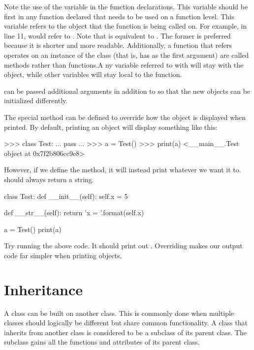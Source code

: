 \documentclass[11pt]{cselabheader}
\begin{document}
Note the use of the variable  in the function declarations.
This variable should be first in any function declared that needs to be used on
a function level. This variable refers to the object that the function is
being called on. For example, in line 11,  would refer to
. Note that  is equivalent to
. The former is preferred because it is shorter
and more readable. Additionally, a function that refers operates on an instance
of the class (that is, has  as the first argument) are called
methods rather than functions.A ny variable referred to with
 will stay with the object, while other
variables will stay local to the function.

 can be passed additional arguments in addition to
 so that the new objects can be initialized differently.

The special method  can be defined to override
how the object is displayed when printed. By default, printing an object will
display something like this:

\begin{pyconcode}
>>> class Test:
...     pass
...
>>> a = Test()
>>> print(a)
<__main__.Test object at 0x7f2b806cc9e8>
\end{pyconcode}

However, if we define the method, it will instead print whatever we want it
to.  should always return a string.

\begin{python3code}
class Test:
    def __init__(self):
        self.x = 5

    def __str__(self):
        return 'x = {}'.format(self.x)

a = Test()
print(a)
\end{python3code}

Try running the above code. It should print out . Overriding
 makes our output code far simpler when printing objects.

\section{Inheritance}
\label{sec:inheritance}
A class can be built on another class. This is commonly done when multiple
classes should logically be different but share common functionality. A class
that inherits from another class is considered to be a subclass of its parent
class. The subclass gains all the functions and attributes of its parent class.
\end{document}
